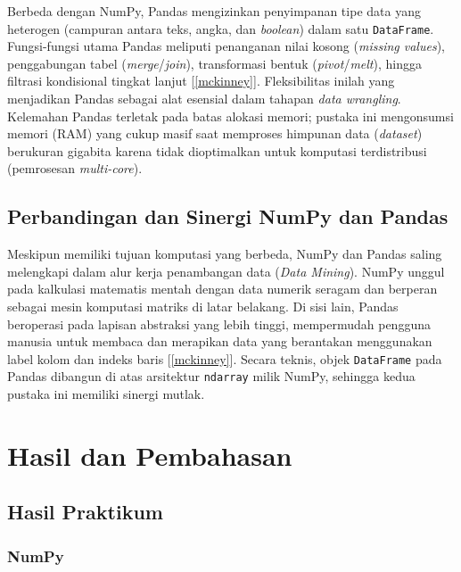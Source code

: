 \documentclass[a4paper,oneside,11pt]{book}
\begin{document}
Berbeda dengan NumPy, Pandas mengizinkan penyimpanan tipe data yang heterogen (campuran antara teks, angka, dan \textit{boolean}) dalam satu \texttt{DataFrame}. Fungsi-fungsi utama Pandas meliputi penanganan nilai kosong (\textit{missing values}), penggabungan tabel (\textit{merge}/\textit{join}), transformasi bentuk (\textit{pivot}/\textit{melt}), hingga filtrasi kondisional tingkat lanjut [\ref{mckinney}]. Fleksibilitas inilah yang menjadikan Pandas sebagai alat esensial dalam tahapan \textit{data wrangling}. Kelemahan Pandas terletak pada batas alokasi memori; pustaka ini mengonsumsi memori (RAM) yang cukup masif saat memproses himpunan data (\textit{dataset}) berukuran gigabita karena tidak dioptimalkan untuk komputasi terdistribusi (pemrosesan \textit{multi-core}).

\section{Perbandingan dan Sinergi NumPy dan Pandas}
Meskipun memiliki tujuan komputasi yang berbeda, NumPy dan Pandas saling melengkapi dalam alur kerja penambangan data (\textit{Data Mining}). NumPy unggul pada kalkulasi matematis mentah dengan data numerik seragam dan berperan sebagai mesin komputasi matriks di latar belakang. Di sisi lain, Pandas beroperasi pada lapisan abstraksi yang lebih tinggi, mempermudah pengguna manusia untuk membaca dan merapikan data yang berantakan menggunakan label kolom dan indeks baris [\ref{mckinney}]. Secara teknis, objek \texttt{DataFrame} pada Pandas dibangun di atas arsitektur \texttt{ndarray} milik NumPy, sehingga kedua pustaka ini memiliki sinergi mutlak.

\chapter{Hasil dan Pembahasan}

\section{Hasil Praktikum}

\subsection{NumPy}
\end{document}
